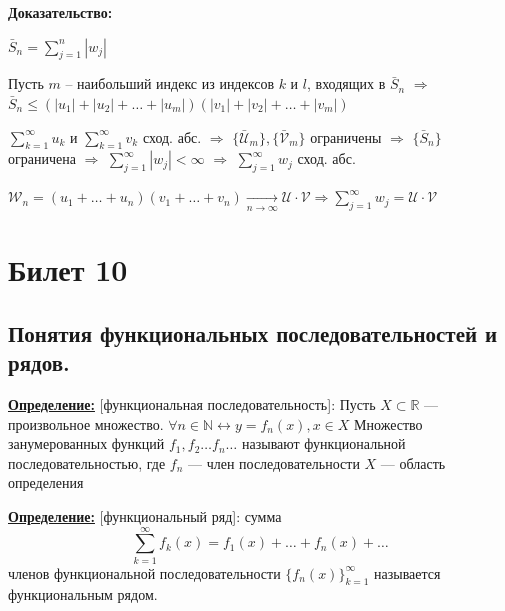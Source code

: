 \documentclass[a4paper,12pt]{article} %
\newcommand{\series}{\sum\limits_{k=1}^{\infty}}
\newcommand{\useries}{\sum\limits_{k=1}^{\infty} u_k}
\begin{document}
\textbf{Доказательство:}

$\bar{S}_n = \sum\limits_{j=1}^{n} |w_j|$

Пусть $m$ -- наибольший индекс из индексов $k$ и $l$, входящих в $\bar{S}_n$ $\Rightarrow$ $\bar{S}_n \leqslant (|u_1| + |u_2| + \ldots + |u_m|)(|v_1| + |v_2| + \ldots + |v_m|)$

$\useries$ и $\series v_k$ сход. абс. $\Rightarrow$ $\{ \bar{\mathscr{U}}_m \}, \{ \bar{\mathscr{V}}_m \}$ ограничены $\Rightarrow$ $\{\bar{S}_n\}$ ограничена $\Rightarrow$ $\sum\limits_{j=1}^{\infty} |w_j| < \infty$ $\Rightarrow$ $\sum\limits_{j=1}^{\infty} w_j$ сход. абс.

$\mathscr{W}_n = (u_1 + \ldots + u_n)(v_1 + \ldots + v_n) \xrightarrow[n \to \infty]{} \mathscr{U} \cdot \mathscr{V} \Rightarrow \sum\limits_{j=1}^{\infty} w_j = \mathscr{U} \cdot \mathscr{V}$


\newpage
\section{Билет 10}

\subsection{Понятия функциональных последовательностей и рядов.}

\underline{\textbf{Определение:}} [функциональная последовательность]:\newline
Пусть $X \subset \mathds{R}$ --- произвольное множество. \newline
\hspace*{5mm}$\forall n \in \mathds{N} \leftrightarrow y = f_n(x), x \in X$ \newline 
Множество занумерованных функций $f_1, f_2 \dots f_n \dots $ называют функциональной последовательностью, где  \newline
\hspace*{50mm}$f_n$ --- член последовательности \newline
 \hspace*{50mm}   $X$ --- область определения 
\newline \newline

\underline{\textbf{Определение:}} [функциональный ряд]:\newline
сумма $${\sum\limits_{k = 1}^{\infty}}  f_k(x) = f_1(x) + \dots + f_n(x) + \dots$$ \newline членов функциональной последовательности $\{f_n(x)\}_{k=1}^\infty$ называется функциональным рядом.
\newline
\end{document}
